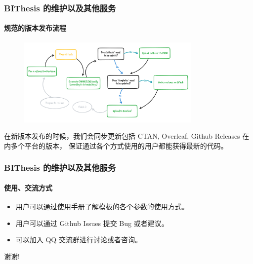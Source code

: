 \documentclass[
  aspectratio=169,
  presentation,
  titlegraphic=./images/bit.png,
  framelogo=./images/bit.png
]{bitbeamer}
\begin{document}
\begin{frame}[c]
  \frametitle{BIThesis 的维护以及其他服务}
  \framesubtitle{规范的版本发布流程}

\begin{figure}
  \begin{center}
    \includegraphics[width=0.8\textwidth]{images/release_workflow.png}
  \end{center}
  \caption{}
\end{figure}

在新版本发布的时候，我们会同步更新包括 CTAN, Overleaf, Github Releases 在内多个平台的版本，
保证通过各个方式使用的用户都能获得最新的代码。

\end{frame}

\begin{frame}[c]
  \frametitle{BIThesis 的维护以及其他服务}
  \framesubtitle{使用、交流方式}

  \begin{itemize}
    \item 用户可以通过使用手册了解模板的各个参数的使用方式。
    \item 用户可以通过 Github Issues 提交 Bug 或者建议。
    \item 可以加入 QQ 交流群进行讨论或者咨询。
  \end{itemize}
\end{frame}


\begin{frame}[c]

  谢谢!
  
\end{frame}
\end{document}
